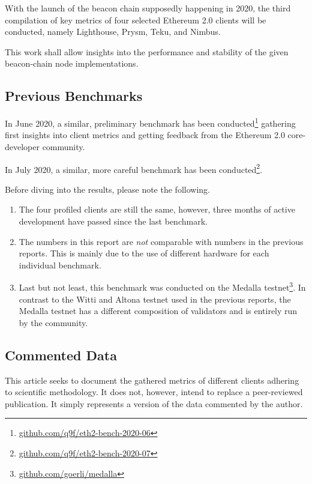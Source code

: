 \documentclass[twoside,twocolumn]{article}
\begin{document}
With the launch of the beacon chain supposedly happening in 2020, the third compilation of key metrics of four selected Ethereum 2.0 clients will be conducted, namely Lighthouse, Prysm, Teku, and Nimbus.\par

This work shall allow insights into the performance and stability of the given beacon-chain node implementations.\par

\subsection{Previous Benchmarks}
In June 2020, a similar, preliminary benchmark has been conducted\footnote{\href{https://github.com/q9f/eth2-bench-2020-06}{github.com/q9f/eth2-bench-2020-06}} gathering first insights into client metrics and getting feedback from the Ethereum 2.0 core-developer community.\par

In July 2020, a similar, more careful benchmark has been conducted\footnote{\href{https://github.com/q9f/eth2-bench-2020-07}{github.com/q9f/eth2-bench-2020-07}}.\par

Before diving into the results, please note the following.

\begin{enumerate}
\item The four profiled clients are still the same, however, three months of active development have passed since the last benchmark.
\item The numbers in this report are \textit{not} comparable with numbers in the previous reports. This is mainly due to the use of different hardware for each individual benchmark.
\item Last but not least, this benchmark was conducted on the Medalla testnet\footnote{\href{https://github.com/goerli/medalla}{github.com/goerli/medalla}}. In contrast to the Witti and Altona testnet used in the previous reports, the Medalla testnet has a different composition of validators and is entirely run by the community.
\end{enumerate}

\subsection{Commented Data}
This article seeks to document the gathered metrics of different clients adhering to scientific methodology. It does not, however, intend to replace a peer-reviewed publication. It simply represents a version of the data commented by the author.\par
\end{document}
